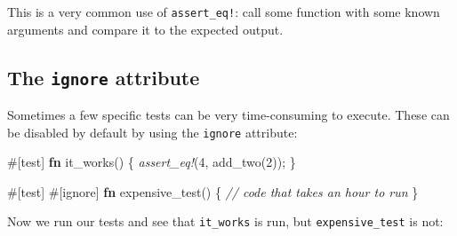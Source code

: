 \documentclass[a4paper,]{book}
\newenvironment{Shaded}{\begin{snugshade}}{\end{snugshade}}
\newcommand{\KeywordTok}[1]{\textcolor[rgb]{0.13,0.29,0.53}{\textbf{{#1}}}}
\newcommand{\DecValTok}[1]{\textcolor[rgb]{0.00,0.00,0.81}{{#1}}}
\newcommand{\CommentTok}[1]{\textcolor[rgb]{0.56,0.35,0.01}{\textit{{#1}}}}
\newcommand{\PreprocessorTok}[1]{\textcolor[rgb]{0.56,0.35,0.01}{\textit{{#1}}}}
\newcommand{\AttributeTok}[1]{\textcolor[rgb]{0.77,0.63,0.00}{{#1}}}
\newcommand{\NormalTok}[1]{{#1}}
\begin{document}
This is a very common use of \texttt{assert\_eq!}: call some function
with some known arguments and compare it to the expected output.

\subsection{\texorpdfstring{The \texttt{ignore}
attribute}{The ignore attribute}}\label{the-ignore-attribute}

Sometimes a few specific tests can be very time-consuming to execute.
These can be disabled by default by using the \texttt{ignore} attribute:

\begin{Shaded}
\begin{Highlighting}[]
\AttributeTok{#[}\NormalTok{test}\AttributeTok{]}
\KeywordTok{fn} \NormalTok{it_works() \{}
    \PreprocessorTok{assert_eq!}\NormalTok{(}\DecValTok{4}\NormalTok{, add_two(}\DecValTok{2}\NormalTok{));}
\NormalTok{\}}

\AttributeTok{#[}\NormalTok{test}\AttributeTok{]}
\AttributeTok{#[}\NormalTok{ignore}\AttributeTok{]}
\KeywordTok{fn} \NormalTok{expensive_test() \{}
    \CommentTok{// code that takes an hour to run}
\NormalTok{\}}
\end{Highlighting}
\end{Shaded}

Now we run our tests and see that \texttt{it\_works} is run, but
\texttt{expensive\_test} is not:

\begin{Shaded}
\end{Shaded}
\end{document}

